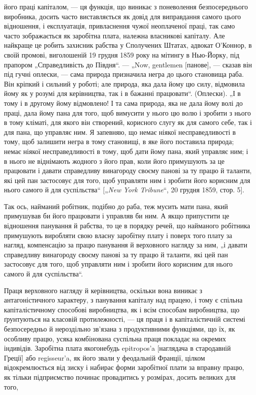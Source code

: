 \parcont{}  %
його праці капіталом, — ця функція, що виникає з поневолення
безпосереднього виробника, досить часто виставляється як довід
для виправдання самого цього відношення, і експлуатація, привласнення
чужої неоплаченої праці, так само часто зображається
як заробітна плата, належна власникові капіталу. Але найкраще
це робить захисник рабства у Сполучених Штатах, адвокат
О’Коннор, в своїй промові, виголошеній 19 грудня 1859 року
на мітингу в Нью-Йорку, під прапором „Справедливість до
Півдня“. — „Now, gentlemen [панове], — сказав він під гучні
оплески, — сама природа призначила негра до цього становища
раба. Він кріпкий і сильний у роботі; але природа, яка дала
йому цю силу, відмовила йому як у розумі для керівництва, так
і в бажанні працювати“. (Оплески). „І в тому і в другому йому
відмовлено! І та сама природа, яка не дала йому волі до праці,
дала йому пана для того, щоб вимусити у нього цю волю і
зробити з нього в тому кліматі, для якого він створений, корисного
слугу як для самого себе, так і для пана, що управляє
ним. Я запевняю, що немає ніякої несправедливості в тому, щоб
залишити негра в тому становищі, в яке його поставила природа;
немає ніякої несправедливості в тому, щоб дати йому пана, який
управляє ним; і в нього не віднімають жодного з його прав, коли
його примушують за це працювати і давати справедливу винагороду
своєму панові за ту працю й таланти, які цей пан застосовує
для того, щоб управляти ним і зробити його корисним
для нього самого й для суспільства“ [„\emph{New York Tribune}“,
20 грудня 1859, стор. 5].

Так ось, найманий робітник, подібно до раба, теж мусить
мати пана, який примушував би його працювати і управляв би
ним. А якщо припустити це відношення панування й рабства,
то це в порядку речей, що найманого робітника примушують
виробляти свою власну заробітну плату і поверх того плату
за нагляд, компенсацію за працю панування й верховного нагляду
за ним, „і давати справедливу винагороду своєму панові
за ту працю й таланти, які цей пан застосовує для того, щоб
управляти ним і зробити його корисним для нього самого й для
суспільства“.

Праця верховного нагляду й керівництва, оскільки вона виникає
з антагоністичного характеру, з панування капіталу над працею,
і тому є спільна капіталістичному способові виробництва,
як і всім способам виробництва, що ґрунтуються на класовій
протилежності, — ця праця і в капіталістичній системі безпосередньо
й нероздільно зв’язана з продуктивними функціями, що
їх, як особливу працю, усяка комбінована суспільна праця покладає
на окремих індивідів. Заробітна плата якогонебудь epitropos’a
[наглядача в стародавній Греції] або regisseur’a, як його звали
у феодальній Франції, цілком відокремлюється від зиску і набирає
форми заробітної плати за вправну працю, як тільки підприємство
починає провадитись у розмірах, досить великих для того,
\parbreak{}  %
